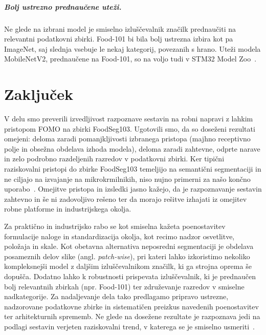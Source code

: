 \documentclass[a4paper,twoside,openright,12pt,slovene]{book}
\begin{document}
        \paragraph{Bolj ustrezno prednaučene uteži.}
        Ne glede na izbrani model je smiselno izluščevalnik značilk prednaučiti
        na relevantni podatkovni zbirki. Food-101 bi bila bolj ustrezna izbira
        kot pa ImageNet, saj slednja vsebuje le nekaj kategorij, povezanih s
        hrano. Uteži modela MobileNetV2, prednaučene na Food-101, so na voljo
        tudi v STM32 Model Zoo~\cite{src:stm32modelzoo}.
        

\chapter{Zaključek} \label{sct:zakljucek}

V delu smo preverili izvedljivost razpoznave sestavin na robni napravi z lahkim
pristopom FOMO na zbirki FoodSeg103. Ugotovili smo, da so doseženi rezultati
omejeni: deloma zaradi pomanjkljivosti izbranega pristopa (majhno receptivno
polje in obsežna obdelava izhoda modela), deloma zaradi zahtevne, odprte narave
in zelo podrobno razdeljenih razredov v podatkovni zbirki. Ker tipični
raziskovalni pristopi do zbirke FoodSeg103 temeljijo na semantični segmentaciji
in ne ciljajo na izvajanje na mikrokrmilnikih, niso nujno primerni za našo
končno uporabo~\cite{src:wu2021large, src:lan2023foodsam}. Omejitve pristopa in
izsledki jasno kažejo, da je razpoznavanje sestavin zahtevno in še ni
zadovoljivo rešeno ter da morajo rešitve izhajati iz omejitev robne platforme
in industrijskega okolja.

Za praktično in industrijsko rabo se kot smiselna kažeta poenostavitev
formulacije naloge in standardizacija okolja, kot recimo nadzor osvetlitve,
položaja in skale. Kot obetavna alternativa neposredni segmentaciji je obdelava
posameznih delov slike (angl. \textit{patch-wise}), pri kateri lahko
izkoristimo nekoliko kompleksnejši model z daljšim izluščevalnikom značilk, ki
ga strojna oprema še dopušča. Dodatno lahko k robustnosti prispevata
izluščevalnik, ki je prednaučen bolj relevantnih zbirkah (npr. Food-101) ter
združevanje razredov v smiselne nadkategorije. Za nadaljevanje dela tako
predlagamo pripravo ustrezne, nadzorovane podatkovne zbirke in sistematičen
preizkus navedenih poenostavitev ter arhitekturnih sprememb. Ne glede na
dosežene rezultate je razpoznava jedi na podlagi sestavin verjeten raziskovalni
trend, v katerega se je smiselno
usmeriti~\cite{src:konstantakopoulos2023review}.
\end{document}
